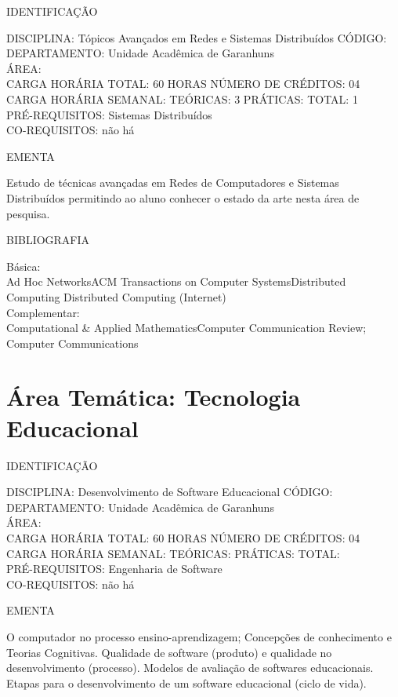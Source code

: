 \documentclass[
	12pt,				%
	openright,			%
  oneside,     %
	a4paper,			%
	chapter=TITLE,		%
	english,			%
	french,				%
	spanish,			%
	brazil				%
	]{abntex2}
\begin{document}
\begin{apendicesenv}
\newpage IDENTIFICAÇÃO

DISCIPLINA: Tópicos Avançados em Redes e Sistemas Distribuídos CÓDIGO:\\ 
DEPARTAMENTO: Unidade Acadêmica de Garanhuns\\ 
ÁREA: \\ 
CARGA HORÁRIA TOTAL: 60 HORAS NÚMERO DE CRÉDITOS: 04\\
CARGA HORÁRIA SEMANAL: TEÓRICAS: 3 PRÁTICAS: TOTAL: 1 \\
PRÉ-REQUISITOS: Sistemas Distribuídos\\
CO-REQUISITOS: não há

EMENTA 

Estudo de técnicas avançadas em Redes de Computadores e Sistemas
Distribuídos permitindo ao aluno conhecer o estado da arte nesta área
de pesquisa.

BIBLIOGRAFIA 

Básica:\\
Ad Hoc NetworksACM Transactions on Computer SystemsDistributed
Computing Distributed Computing (Internet)\\
Complementar:\\
Computational \& Applied MathematicsComputer Communication Review;
Computer Communications\\
\newpage 

\section*{Área Temática: Tecnologia Educacional}

IDENTIFICAÇÃO

DISCIPLINA: Desenvolvimento de Software Educacional CÓDIGO:\\
DEPARTAMENTO: Unidade Acadêmica de Garanhuns\\
ÁREA: \\
CARGA HORÁRIA TOTAL: 60 HORAS NÚMERO DE CRÉDITOS: 04\\
CARGA HORÁRIA SEMANAL: TEÓRICAS: PRÁTICAS: TOTAL: \\
PRÉ-REQUISITOS: Engenharia de Software\\
CO-REQUISITOS: não há

EMENTA 

O computador no processo ensino-aprendizagem; Concepções de
conhecimento e Teorias Cognitivas. Qualidade de software
(produto) e qualidade no desenvolvimento (processo). Modelos de
avaliação de softwares educacionais. Etapas para o
desenvolvimento de um software educacional (ciclo de vida).


\end{apendicesenv}
\end{document}
